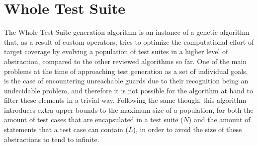 \documentclass[%
  chapterprefix=false,%
  open=right,%
  twoside=true,%
  paper=a4,%
  logofile={Figures/logo.png},%
  thesistype=master,%
  UKenglish,%
]{se2thesis}
\begin{document}
\section{Whole Test Suite}

The Whole Test Suite generation algorithm is an instance of a genetic algorithm that, as a result of custom operators, tries to optimize the computational effort of target coverage by evolving a population of test suites in a higher level of abstraction, compared to the other reviewed algorithms so far.
One of the main problems at the time of approaching test generation as a set of individual goals, is the case of encountering unreachable guards due to their recognition being an undecidable problem, and therefore it is not possible for the algorithm at hand to filter these elements in a trivial way.
Following the same though, this algorithm introduces extra upper bounds to the maximum size of a population, for both the amount of test cases that are encapsulated in a test suite (\(N\)) and the amount of statements that a test case can contain (\(L\)), in order to avoid the size of these abstractions to tend to infinite.
\end{document}
